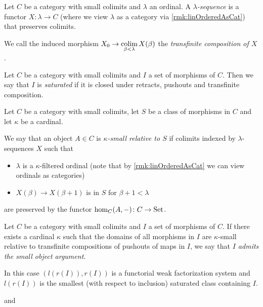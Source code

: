 \begin{definition} %
    Let $C$ be a category with small colimits and $\lambda$ an ordinal.
    A \emph{$\lambda$-sequence} is a functor $X\colon\lambda\to C$ (where we view $\lambda$ as a category via \cref{rmk:linOrderedAsCat}) that preserves colimits.

    We call the induced morphism $X_0\to\operatorname*{colim}\limits_{\beta<\lambda} X(\beta)$ the \emph{transfinite composition of $X$}.
\end{definition}
\begin{definition}
    Let $C$ be a category with small colimits and $I$ a set of morphisms of $C$.
    Then we say that $I$ is \emph{saturated} if it is closed under retracts, pushouts and transfinite composition.
\end{definition}
\begin{definition}
    Let $C$ be a category with small colimits, let $S$ be a class of morphisms in $C$ and let $\kappa$ be a cardinal.
    
    We say that an object $A\in C$ is \emph{$\kappa$-small relative to $S$} if colimits indexed by $\lambda$-sequences $X$ such that 
    \begin{itemize}
        \item $\lambda$ is a $\kappa$-filtered ordinal (note that by \cref{rmk:linOrderedAsCat} we can view ordinals as categories)
        \item $X(\beta)\to X(\beta+1)$ is in $S$ for $\beta+1<\lambda$
    \end{itemize}
    are preserved by the functor $\hom_C(A,-)\colon C\to\operatorname{Set}$.
\end{definition}
\begin{thm}[Small Object Argument] %
    Let $C$ be a category with small colimits and $I$ a set of morphisms of $C$.
    If there exists a cardinal $\kappa$ such that the domains of all morphisms in $I$ are $\kappa$-small relative to transfinite compositions of pushouts of maps in $I$, we say that \emph{$I$ admits the small object argument}.
    
    In this case $(l(r(I)),r(I))$ is a functorial weak factorization system and $l(r(I))$ is the smallest (with respect to inclusion) saturated class containing $I$.
\end{thm}
\begin{reference}
    \cite[Theorem 2.1.14]{hovey2007model} and \cite[Proposition 2.1.5]{cisinski_2019}
\end{reference}
